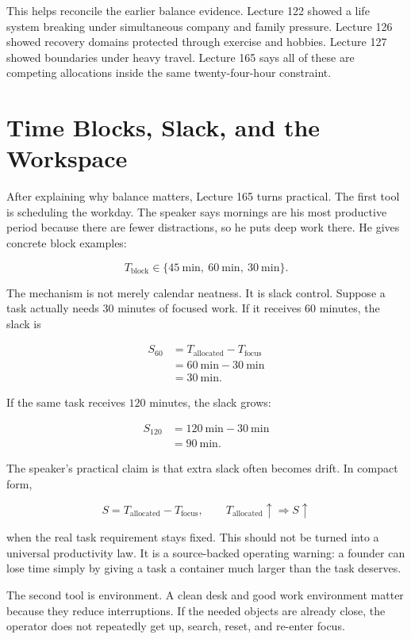 \documentclass[11pt,oneside]{book}
\begin{document}
This helps reconcile the earlier balance evidence. Lecture 122 showed a life system breaking under simultaneous company and family pressure. Lecture 126 showed recovery domains protected through exercise and hobbies. Lecture 127 showed boundaries under heavy travel. Lecture 165 says all of these are competing allocations inside the same twenty-four-hour constraint.

\section{Time Blocks, Slack, and the Workspace}

After explaining why balance matters, Lecture 165 turns practical. The first tool is scheduling the workday. The speaker says mornings are his most productive period because there are fewer distractions, so he puts deep work there. He gives concrete block examples:

\[
T_{\mathrm{block}}
\in
\{45\ \mathrm{min},\ 60\ \mathrm{min},\ 30\ \mathrm{min}\}.
\]

The mechanism is not merely calendar neatness. It is slack control. Suppose a task actually needs \(30\) minutes of focused work. If it receives \(60\) minutes, the slack is

\begin{align}
S_{60}
&=
T_{\mathrm{allocated}}-T_{\mathrm{focus}}\\
&=
60\ \mathrm{min}-30\ \mathrm{min}\\
&=
30\ \mathrm{min}.
\end{align}

If the same task receives \(120\) minutes, the slack grows:

\begin{align}
S_{120}
&=
120\ \mathrm{min}-30\ \mathrm{min}\\
&=
90\ \mathrm{min}.
\end{align}

The speaker's practical claim is that extra slack often becomes drift. In compact form,

\[
S=T_{\mathrm{allocated}}-T_{\mathrm{focus}},
\qquad
T_{\mathrm{allocated}}\uparrow
\Rightarrow
S\uparrow
\]

when the real task requirement stays fixed. This should not be turned into a universal productivity law. It is a source-backed operating warning: a founder can lose time simply by giving a task a container much larger than the task deserves.

The second tool is environment. A clean desk and good work environment matter because they reduce interruptions. If the needed objects are already close, the operator does not repeatedly get up, search, reset, and re-enter focus.
\end{document}
